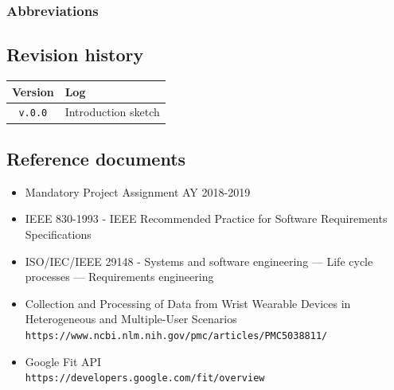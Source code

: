 \documentclass[12pt]{article}
\begin{document}
      \begin{description}
        \item[]
      \end{description}

    \subsubsection{Abbreviations}

      \begin{description}
        \item[]
      \end{description}

  \subsection{Revision history}
  \label{sec:revhistory}

    \begin{table}[hbt!]
      \begin{tabular}{|c|l|}
        \hline
        \textbf{Version}                & \textbf{Log} \\ \hline
        \texttt{v.0.0} &
          Introduction sketch
        \\ \hline
      \end{tabular}
    \end{table}

  \subsection{Reference documents}

    \begin{itemize}
      \item Mandatory Project Assignment AY 2018-2019
      \item IEEE 830-1993 - IEEE Recommended Practice for Software Requirements Specifications
      \item ISO/IEC/IEEE 29148 - Systems and software engineering — Life cycle processes — Requirements engineering
      \item Collection and Processing of Data from Wrist Wearable Devices in Heterogeneous and Multiple-User Scenarios \\ \texttt{https://www.ncbi.nlm.nih.gov/pmc/articles/PMC5038811/}
      \item Google Fit API \\
      \texttt{https://developers.google.com/fit/overview}
    \end{itemize}
\end{document}

